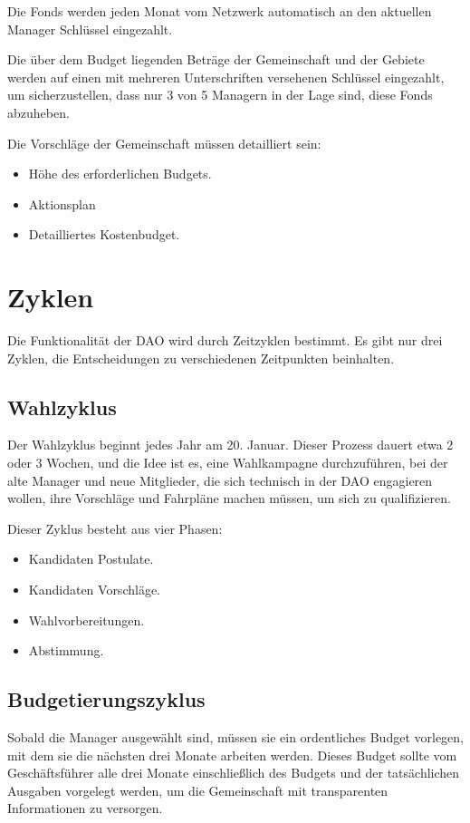 \documentclass{article}
\begin{document}
Die Fonds werden jeden Monat vom Netzwerk automatisch an den aktuellen Manager Schlüssel eingezahlt.

Die über dem Budget liegenden Beträge der Gemeinschaft und der Gebiete werden auf einen mit mehreren Unterschriften versehenen Schlüssel eingezahlt, um sicherzustellen, dass nur 3 von 5 Managern in der Lage sind, diese Fonds abzuheben.

Die Vorschläge der Gemeinschaft müssen detailliert sein:

\begin{itemize}
  \item Höhe des erforderlichen Budgets.
  \item Aktionsplan
  \item Detailliertes Kostenbudget.
\end{itemize}

\section{Zyklen}

Die Funktionalität der DAO wird durch Zeitzyklen bestimmt. Es gibt nur drei Zyklen, die Entscheidungen zu verschiedenen Zeitpunkten beinhalten.

\subsection{Wahlzyklus}

Der Wahlzyklus beginnt jedes Jahr am 20. Januar. Dieser Prozess dauert etwa 2 oder 3 Wochen, und die Idee ist es, eine Wahlkampagne durchzuführen, bei der alte Manager und neue Mitglieder, die sich technisch in der DAO engagieren wollen, ihre Vorschläge und Fahrpläne machen müssen, um sich zu qualifizieren.

Dieser Zyklus besteht aus vier Phasen:

\begin{itemize}
  \item Kandidaten Postulate.
  \item Kandidaten Vorschläge.
  \item Wahlvorbereitungen.
  \item Abstimmung.
\end{itemize}

\subsection{Budgetierungszyklus}

Sobald die Manager ausgewählt sind, müssen sie ein ordentliches Budget vorlegen, mit dem sie die nächsten drei Monate arbeiten werden. Dieses Budget sollte vom Geschäftsführer alle drei Monate einschließlich des Budgets und der tatsächlichen Ausgaben vorgelegt werden, um die Gemeinschaft mit transparenten Informationen zu versorgen.
\end{document}
